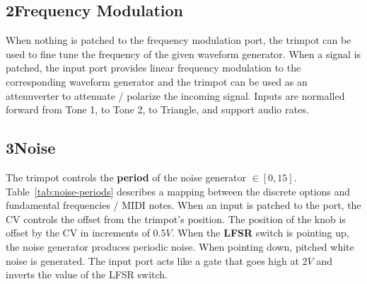 \documentclass[12pt,letter]{article}
\begin{document}
\subsection*{2{\quad}Frequency Modulation}

When nothing is patched to the frequency modulation port, the trimpot can be used to fine tune the frequency of the given waveform generator. When a signal is patched, the input port provides linear frequency modulation to the corresponding waveform generator and the trimpot can be used as an attenuverter to attenuate / polarize the incoming signal. Inputs are normalled forward from Tone 1, to Tone 2, to Triangle, and support audio rates.

\subsection*{3{\quad}Noise}

The trimpot controls the \textbf{period} of the noise generator $\in [0, 15]$. Table~\ref{tab:noise-periods} describes a mapping between the discrete options and fundamental frequencies / MIDI notes. When an input is patched to the port, the CV controls the offset from the trimpot's position. The position of the knob is offset by the CV in increments of $0.5V$. When the \textbf{LFSR} switch is pointing up, the noise generator produces periodic noise. When pointing down, pitched white noise is generated. The input port acts like a gate that goes high at $2V$ and inverts the value of the LFSR switch.
\end{document}
